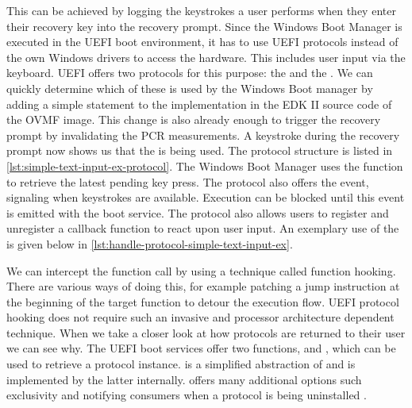 This can be achieved by logging the keystrokes a user performs when they enter their recovery key into the recovery prompt.
Since the Windows Boot Manager is executed in the \ac{UEFI} boot environment, it has to use \ac{UEFI} protocols instead of the own Windows drivers to access the hardware.
This includes user input via the keyboard.
\ac{UEFI} offers two protocols for this purpose: the  and the .
We can quickly determine which of these is used by the Windows Boot manager by adding a simple  statement to the implementation in the \ac{EDK} II source code of the \ac{OVMF} image.
This change is also already enough to trigger the recovery prompt by invalidating the \ac{PCR} measurements.
A keystroke during the recovery prompt now shows us that the  is being used.
The protocol structure is listed in \autoref{lst:simple-text-input-ex-protocol}.
The Windows Boot Manager uses the  function to retrieve the latest pending key press.
The protocol also offers the  event, signaling when keystrokes are available.
Execution can be blocked until this event is emitted with the  boot service.
The protocol also allows users to register and unregister a callback function to react upon user input.
An exemplary use of the  is given below in \autoref{lst:handle-protocol-simple-text-input-ex}.

\vspace{1em}



We can intercept the  function call by using a technique called function hooking.
There are various ways of doing this, for example patching a jump instruction at the beginning of the target function to detour the execution flow.
\ac{UEFI} protocol hooking does not require such an invasive and processor architecture dependent technique.
When we take a closer look at how protocols are returned to their user we can see why.
The \ac{UEFI} boot services offer two functions,  and , which can be used to retrieve a protocol instance.
 is a simplified abstraction of  and is implemented by the latter internally.
 offers many additional options such exclusivity and notifying consumers when a protocol is being uninstalled \cite[Section 7.3]{uefi-spec}.

